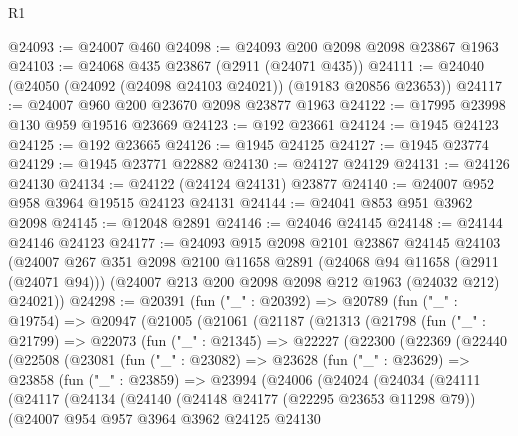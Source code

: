 \begin{lexlean}{R1}
\begin{coremodule}
@24093 := @24007 @460
@24098 := @24093 @200 @2098 @2098 @23867 @1963
@24103 := @24068 @435 @23867 (@2911 (@24071 @435))
@24111 := @24040 (@24050 (@24092 (@24098 @24103 @24021)) (@19183 @20856 @23653))
@24117 := @24007 @960 @200 @23670 @2098 @23877 @1963
@24122 := @17995 @23998 @130 @959 @19516 @23669
@24123 := @192 @23661
@24124 := @1945 @24123
@24125 := @192 @23665
@24126 := @1945 @24125
@24127 := @1945 @23774
@24129 := @1945 @23771 @22882
@24130 := @24127 @24129
@24131 := @24126 @24130
@24134 := @24122 (@24124 @24131) @23877
@24140 := @24007 @952 @958 @3964 @19515 @24123 @24131
@24144 := @24041 @853 @951 @3962 @2098
@24145 := @12048 @2891
@24146 := @24046 @24145
@24148 := @24144 @24146 @24123
@24177 := @24093
    @915
    @2098
    @2101
    @23867
    @24145
    @24103
    (@24007
      @267
      @351
      @2098
      @2100
      @11658
      @2891
      (@24068 @94 @11658 (@2911 (@24071 @94)))
      (@24007 @213 @200 @2098 @2098 @212 @1963 (@24032 @212) @24021))
@24298 := @20391
    (fun ("_" : @20392) =>
    @20789
      (fun ("_" : @19754) =>
      @20947
        (@21005
          (@21061
            (@21187
              (@21313
                (@21798
                  (fun ("_" : @21799) =>
                  @22073
                    (fun ("_" : @21345) =>
                    @22227
                      (@22300
                        (@22369
                          (@22440
                            (@22508
                              (@23081
                                (fun ("_" : @23082) =>
                                @23628
                                  (fun ("_" : @23629) =>
                                  @23858
                                    (fun ("_" : @23859) =>
                                    @23994
                                      (@24006
                                        (@24024
                                          (@24034
                                            (@24111
                                              (@24117
                                                (@24134
                                                  (@24140
                                                    (@24148 @24177 (@22295 @23653 @11298 @79))
                                                    (@24007
                                                      @954
                                                      @957
                                                      @3964
                                                      @3962
                                                      @24125
                                                      @24130

\end{coremodule}
\end{lexlean}

